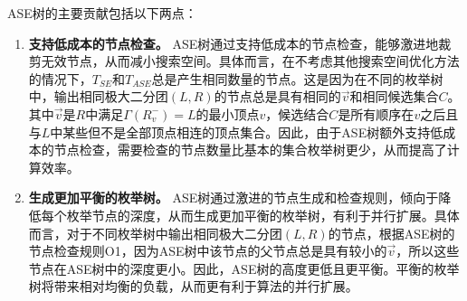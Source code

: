 \begin{example}



\end{example}

ASE树的主要贡献包括以下两点：

\begin{enumerate}
  \item \textbf{支持低成本的节点检查。} ASE树通过支持低成本的节点检查，能够激进地裁剪无效节点，从而减小搜索空间。具体而言，在不考虑其他搜索空间优化方法的情况下，$T_{SE}$和$T_{ASE}$总是产生相同数量的节点。这是因为在不同的枚举树中，输出相同极大二分团$(L,R)$的节点总是具有相同的$\vec{v}$和相同候选集合$C$。其中$\vec{v}$是$R$中满足$\Gamma(R_v^-)=L$的最小顶点$v$，候选结合$C$是所有顺序在$v$之后且与$L$中某些但不是全部顶点相连的顶点集合。因此，由于ASE树额外支持低成本的节点检查，需要检查的节点数量比基本的集合枚举树更少，从而提高了计算效率。

  \item \textbf{生成更加平衡的枚举树。} ASE树通过激进的节点生成和检查规则，倾向于降低每个枚举节点的深度，从而生成更加平衡的枚举树，有利于并行扩展。具体而言，对于不同枚举树中输出相同极大二分团$(L,R)$的节点，根据ASE树的节点检查规则O1，因为ASE树中该节点的父节点总是具有较小的$\vec{v}$，所以这些节点在ASE树中的深度更小。因此，ASE树的高度更低且更平衡。平衡的枚举树将带来相对均衡的负载，从而更有利于算法的并行扩展。

\end{enumerate}

